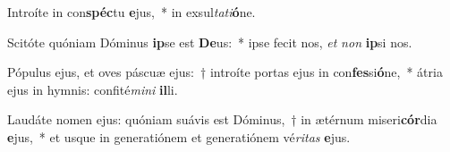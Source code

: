 \item Introíte in con\textbf{spéc}tu \textbf{e}jus,~* in exsul\textit{ta}\textit{ti}\textbf{ó}ne.
\item Scitóte quóniam Dóminus \textbf{ip}se est \textbf{De}us:~* ipse fecit nos, \textit{et} \textit{non} \textbf{ip}si nos.
\item Pópulus ejus, et oves páscuæ ejus:~† introíte portas ejus in con\textbf{fes}si\textbf{ó}ne,~* átria ejus in hymnis: confité\textit{mi}\textit{ni} \textbf{il}li.
\item Laudáte nomen ejus: quóniam suávis est Dóminus,~† in ætérnum miseri\textbf{cór}dia \textbf{e}jus,~* et usque in generatiónem et generatiónem vé\textit{ri}\textit{tas} \textbf{e}jus.
